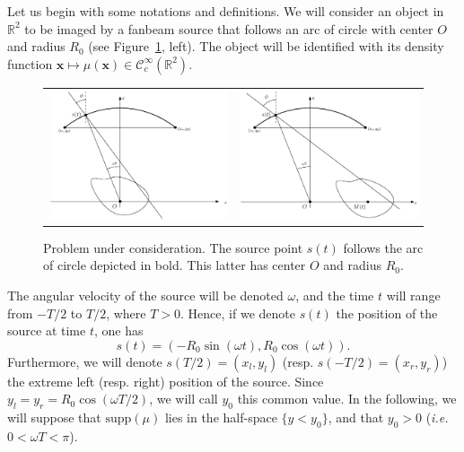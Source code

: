 \documentclass[a4paper]{article}
\numberwithin{equation}{section}
\newcommand{\R}{\mathbb{R}}
\newcommand{\ie}{\emph{i.e.} }
\newcommand{\Ccinf}{\mathcal{C}_c^{\infty}}
\newcommand{\supp}{\textrm{supp}}
\begin{document}
Let us begin with some notations and definitions. We will consider an object in $\R^2$ to be imaged by a fanbeam source that follows an arc of circle with center $O$ and radius $R_0$ (see Figure~\ref{fig:notations}, left). The object will be identified with its density function $\mathbf{x} \mapsto \mu(\mathbf{x}) \in \Ccinf(\R^2)$.
\begin{figure}[!ht]
	\centering
	\begin{tabular}{cc}
	\includegraphics[width=8cm]{figs/frame_scanner_still.eps} &
	\includegraphics[width=8cm]{figs/frame_scanner.eps}
	\end{tabular}
	\caption{Problem under consideration. The source point $s(t)$ follows the arc of circle depicted in bold. This latter has center $O$ and radius $R_0$.\label{fig:notations}}
\end{figure}
The angular velocity of the source will be denoted $\omega$, and the time $t$ will range from $-T/2$ to $T/2$, where $T>0$. Hence, if we denote $s(t)$ the position of the source at time $t$, one has
\begin{equation}
	s(t) = \left( -R_0 \sin(\omega t), R_0 \cos(\omega t) \right).
\label{eq:source_position}
\end{equation}
Furthermore, we will denote $s(T/2)=(x_l,y_l)$ (resp. $s(-T/2)=(x_r,y_r)$) the extreme left (resp. right) position of the source. Since $y_l = y_r = R_0 \cos(\omega T/2)$, we will call $y_0$ this common value. In the following, we will suppose that $\supp(\mu)$ lies in the half-space $\{ y < y_0 \}$, and that $y_0 > 0$ (\ie $0 < \omega T < \pi$).
\end{document}
